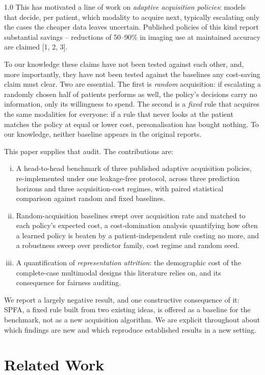 \documentclass[12pt,twoside]{article}
\begin{document}
\begin{spacing}{1.0}
This has motivated a line of work on \emph{adaptive acquisition policies}:
models that decide, per patient, which modality to acquire next, typically
escalating only the cases the cheaper data leaves uncertain. Published
policies of this kind report substantial savings -- reductions of 50--90\%
in imaging use at maintained accuracy are claimed [1, 2, 3].

To our knowledge these claims have not been tested against each other, and,
more importantly, they have not been tested against the baselines any cost-saving claim must
clear. Two are essential. The first is \emph{random} acquisition: if
escalating a randomly chosen half of patients performs as well, the policy's
decisions carry no information, only its willingness to spend. The second
is a \emph{fixed} rule that acquires the same modalities for everyone: if a
rule that never looks at the patient matches the policy at equal or lower
cost, personalisation has bought nothing. To our knowledge, neither baseline
appears in the original reports.

This paper supplies that audit. The contributions are:

\begin{enumerate}[(i)]
\item A head-to-head benchmark of three published adaptive acquisition
policies, re-implemented under one leakage-free protocol, across three
prediction horizons and three acquisition-cost regimes, with paired
statistical comparison against random and fixed baselines.
\item Random-acquisition baselines swept over acquisition rate and matched
to each policy's expected cost, a cost-domination analysis quantifying how
often a learned policy is beaten by a patient-independent rule costing no
more, and a robustness sweep over predictor family, cost regime and random
seed.
\item A quantification of \emph{representation attrition}: the demographic
cost of the complete-case multimodal designs this literature relies on,
and its consequence for fairness auditing.
\end{enumerate}

We report a largely negative result, and one constructive consequence of
it: SPFA, a fixed rule built from two existing ideas, is offered as a
baseline for the benchmark, not as a new acquisition algorithm. We are
explicit throughout about which findings are new and which reproduce
established results in a new setting.

\section{Related Work}


\end{spacing}
\end{document}

